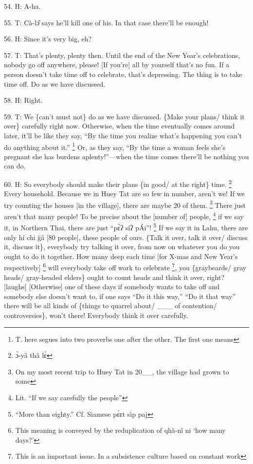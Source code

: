54. H: A-ha.

55. T: Cà-lɔ̂ says he'll kill one of his.  In that case there'll be enough!

56. H: Since it's very big, eh?

57. T: That's plenty, plenty then.  Until the end of the New Year's celebrations,
nobody go off anywhere, please!  [If you're] all by yourself that's no fun.  If
a person doesn't take time off to celebrate, that's depressing.  The thing is to
take time off.  Do as we have discussed.

58. H: Right.

59. T: We \{can't must not\} do as we have discussed.  \{Make your plans/ think
it over\} carefully right now.  Otherwise, when the time eventually comes around
later, it'll be like they say, ``By the time you realize what's happening you can't
do anything about it.'' \footnote{T. here segues into two proverbs one after the other.  The first one means} Or, as they say, ``By the time a woman feels she's
pregnant she has burdens aplenty!''---when the time comes there'll be nothing you
can do.

60. H: So everybody should make their plans \{in good/ at the right\} time. \footnote{ɔ̀-yâ thâ lɛ̀}
Every household.  Because we in Huey Tat are so few in number, aren't we!  If
we try counting the houses [in the village], there are maybe 20 of them. \footnote{On my most recent trip to Huey Tat in 20\_\_, the village had grown to some} There
just aren't that many people!  To be precise about the [number of] people, \footnote{Lit. ``If we say carefully the people''}
if we say it, in Northern Thai, there are just ``pɛ̀ʔ sîʔ pÁi''! \footnote{``More than eighty.'' Cf. Siamese pɛ̀ɛt sìp paj} If
we say it in Lahu, there are only hí chi g̈â [80 people], these people of ours.
\{Talk it over, talk it over/ discuss it, discuss it\}, everybody try talking
it over, from now on whatever you do you ought to do it together.  How many deep
each time [for X-mas and New Year's respectively] \footnote{This meaning is conveyed by the reduplication of qhà-nî ni `how many days?'} will everybody take off
work to celebrate \footnote{This is an important issue.  In a subsistence culture based on constant work}, you \{graybeards/ gray heads/ gray-headed elders\} ought
to count heads and think it over, right? [laughs] [Otherwise] one of these days
if somebody wants to take off and somebody else doesn't want to, if one says ``Do
it this way,'' ``Do it that way'' there will be all kinds of \{things to quarrel
about/ \_\_\_ of contention/ controversies\}, won't there!  Everybody think it
over carefully.

